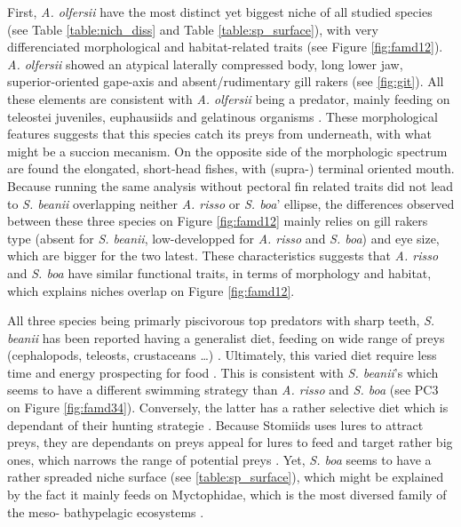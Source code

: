 First, \textit{A. olfersii} have the most distinct yet biggest niche of all studied species (see Table \ref{table:nich_diss} and Table \ref{table:sp_surface}), with very differenciated morphological and habitat-related traits (see Figure \ref{fig:famd12}). \textit{A. olfersii} showed an atypical laterally compressed body, long lower jaw, superior-oriented gape-axis and absent/rudimentary gill rakers (see \ref{fig:git}). All these elements are consistent with \textit{A. olfersii} being a predator, mainly feeding on teleostei juveniles, euphausiids and gelatinous organisms \citep{eduardo2020}. These morphological features suggests that this species catch its preys from underneath, with what might be a succion mecanism. On the opposite side of the morphologic spectrum are found the elongated, short-head fishes, with (supra-) terminal oriented mouth. Because running the same analysis without pectoral fin related traits did not lead to \textit{S. beanii} overlapping neither \textit{A. risso} or \textit{S. boa}' ellipse, the differences observed between these three species on Figure \ref{fig:famd12} mainly relies on gill rakers type (absent for \textit{S. beanii}, low-developped for \textit{A. risso} and \textit{S. boa}) and eye size, which are bigger for the two latest. These characteristics suggests that \textit{A. risso} and \textit{S. boa} have similar functional traits, in terms of morphology and habitat, which explains niches overlap on Figure \ref{fig:famd12}. 

All three species being primarly piscivorous top predators with sharp teeth, \textit{S. beanii} has been reported having a generalist diet, feeding on wide range of preys (cephalopods, teleosts, crustaceans \ldots{}) \citep{geidner2008}. Ultimately, this varied diet require less time and energy prospecting for food \citep{geidner2008}. This is consistent with \textit{S. beanii}'s which seems to have a different swimming strategy than \textit{A. risso} and \textit{S. boa} (see PC3 on Figure \ref{fig:famd34}). Conversely, the latter has a rather selective diet which is dependant of their hunting strategie \citep{sutton1996}. Because Stomiids uses lures to attract preys, they are dependants on preys appeal for lures to feed and target rather big ones, which narrows the range of potential preys \citep{geidner2008,germain2019}. Yet, \textit{S. boa} seems to have a rather spreaded niche surface (see \ref{table:sp_surface}), which might be explained by the fact it mainly feeds on Myctophidae, which is the most diversed family of the meso- bathypelagic ecosystems \citep{garcia2021,sutton1996}. 

